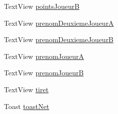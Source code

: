 \begin{DoxyCompactItemize}
\item 
Text\+View \hyperlink{classcom_1_1example_1_1area_1_1_i_h_m_gestion_partie_a88e51101924801095d21f65d16b337f3}{points\+JoueurB}
\item 
Text\+View \hyperlink{classcom_1_1example_1_1area_1_1_i_h_m_gestion_partie_af209e9cda709137d8b77170a35b295e0}{prenom\+Deuxieme\+JoueurA}
\item 
Text\+View \hyperlink{classcom_1_1example_1_1area_1_1_i_h_m_gestion_partie_aa5e959a5694b49790434a7d1006f57f3}{prenom\+Deuxieme\+JoueurB}
\item 
Text\+View \hyperlink{classcom_1_1example_1_1area_1_1_i_h_m_gestion_partie_a9a5b0bc9c6f1d865b85bfe789219e16e}{prenom\+JoueurA}
\item 
Text\+View \hyperlink{classcom_1_1example_1_1area_1_1_i_h_m_gestion_partie_aa25eb218f30b28bb0b750c9fa0c1a9af}{prenom\+JoueurB}
\item 
Text\+View \hyperlink{classcom_1_1example_1_1area_1_1_i_h_m_gestion_partie_a84e6684857fc76364978fff7bfbc4e00}{tiret}
\item 
Toast \hyperlink{classcom_1_1example_1_1area_1_1_i_h_m_gestion_partie_a490bd4b5241dfe6a5e709209a939fa2e}{toast\+Net}
\end{DoxyCompactItemize}

